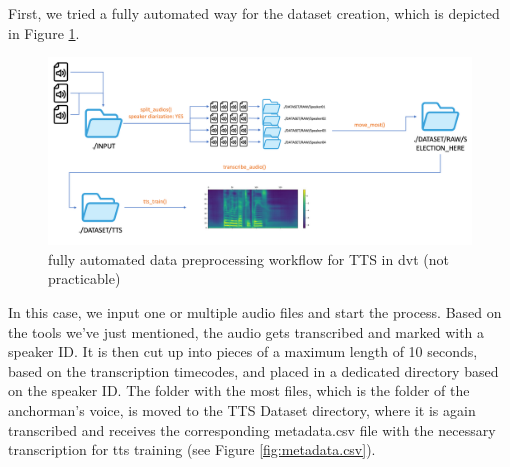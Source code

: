 \documentclass[
  a4paper,  %
  twoside,  %
  bibliography=totoc,
  headsepline,
  cleardoublepage=empty,
  parskip=half,
  draft=false
]{scrbook}
\begin{document}
First, we tried a fully automated way for the dataset creation, which is depicted in Figure \ref{fig:dvt-tts-original}.
\begin{figure}[h]
  \centering
  \includegraphics[width=1\textwidth]{./graphics/images/tts/tts dvt only.png}
  \caption{fully automated data preprocessing workflow for TTS in \gls{dvt} (not practicable)}
  \label{fig:dvt-tts-original}
\end{figure}

In this case, we input one or multiple audio files and start the process. Based on the tools we've just mentioned, the audio gets transcribed and marked with a speaker ID.
It is then cut up into pieces of a maximum length of 10 seconds, based on the transcription timecodes, and placed in a dedicated directory based on the speaker ID. The folder with the most files, which is the folder of the anchorman's voice, is moved to the TTS Dataset directory, where it is again transcribed and receives the corresponding metadata.csv file with the necessary transcription for \gls{tts} training (see Figure \ref{fig:metadata.csv}).
\end{document}
